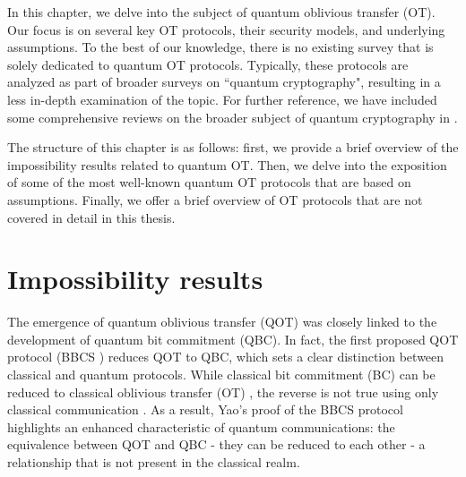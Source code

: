 In this chapter, we delve into the subject of quantum oblivious transfer (OT). Our focus is on several key OT protocols, their security models, and underlying assumptions. To the best of our knowledge, there is no existing survey that is solely dedicated to quantum OT protocols. Typically, these protocols are analyzed as part of broader surveys on ``quantum cryptography", resulting in a less in-depth examination of the topic. For further reference, we have included some comprehensive reviews on the broader subject of quantum cryptography in \cite{BC96, B05, M06, F10, B15, PAB+20, PR21, SH22}.

The structure of this chapter is as follows: first, we provide a brief overview of the impossibility results related to quantum OT. Then, we delve into the exposition of some of the most well-known quantum OT protocols that are based on assumptions. Finally, we offer a brief overview of OT protocols that are not covered in detail in this thesis.

\section{Impossibility results}

The emergence of quantum oblivious transfer (QOT) was closely linked to the development of quantum bit commitment (QBC). In fact, the first proposed QOT protocol (BBCS \cite{BBCS92}) reduces QOT to QBC, which sets a clear distinction between classical and quantum protocols. While classical bit commitment (BC) can be reduced to classical oblivious transfer (OT) \cite{K88}, the reverse is not true using only classical communication \cite{S99}. As a result, Yao's proof \cite{Y95} of the BBCS protocol \cite{BBCS92} highlights an enhanced characteristic of quantum communications: the equivalence between QOT and QBC - they can be reduced to each other - a relationship that is not present in the classical realm.


